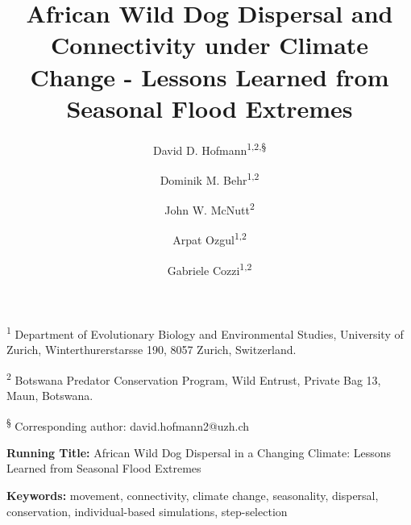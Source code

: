 \documentclass[abstract=on,10pt,a4paper,bibliography=totocnumbered]{article}
\title{African Wild Dog Dispersal and Connectivity under Climate Change -
Lessons Learned from Seasonal Flood Extremes}
\author{
  David D. Hofmann\textsuperscript{1,2,\S} \orcid{0000-0003-3477-4365} \and
  Dominik M. Behr\textsuperscript{1,2} \orcid{0000-0001-7378-8538} \and
  John W. McNutt\textsuperscript{2} \and
  Arpat Ozgul\textsuperscript{1,2} \orcid{0000-0001-7477-2642} \and
  Gabriele Cozzi\textsuperscript{1,2} \orcid{0000-0002-1744-1940}
}
\begin{document}



\maketitle

\begin{flushleft}

\vspace{0.5cm}

\textsuperscript{1} Department of Evolutionary Biology and Environmental
Studies, University of Zurich, Winterthurerstarsse 190, 8057 Zurich,
Switzerland.

\textsuperscript{2} Botswana Predator Conservation Program, Wild Entrust,
Private Bag 13, Maun, Botswana.

\textsuperscript{\S} Corresponding author: david.hofmann2@uzh.ch

\vspace{4cm}

\textbf{Running Title:} African Wild Dog Dispersal in a Changing Climate:
Lessons Learned from Seasonal Flood Extremes

\vspace{0.5cm}

\textbf{Keywords:} movement, connectivity, climate change, seasonality,
dispersal, conservation, individual-based simulations, step-selection

\end{flushleft}
\end{document}

